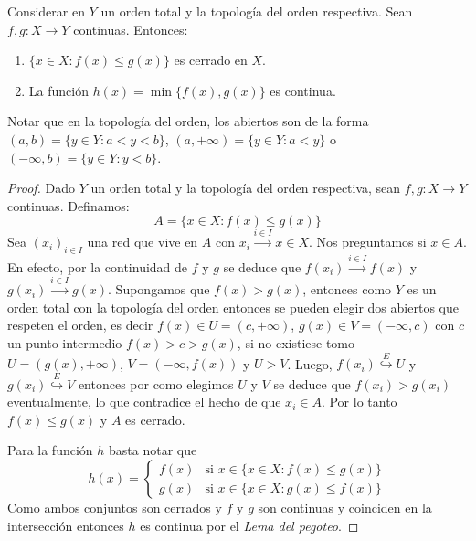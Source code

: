 \documentclass{article}
\theoremstyle{plain}
\theoremstyle{definition}
\newcommand{\evto}[1]{\stackrel{E}{\hookrightarrow} #1}   %
\newenvironment{ejercicio}[1]{\begin{trivlist}
\item[\hskip \labelsep {\bfseries Ejercicio}\hskip \labelsep {\bfseries #1.}]}{\end{trivlist}}
\begin{document}
\begin{ejercicio}{3}
    Considerar en \( Y \) un orden total y la topología del orden respectiva. Sean \( f, g : X \to Y \) continuas. Entonces:
    \begin{enumerate}
        \item \( \{ x \in X : f(x) \leq g(x) \} \) es cerrado en \( X \).
        \item La función \( h(x) = \min \{ f(x), g(x) \} \) es continua.
    \end{enumerate}
    Notar que en la topología del orden, los abiertos son de la forma \( (a, b) = \{ y \in Y : a < y < b \} \), \( (a, +\infty) = \{ y \in Y : a < y \} \) o \( (-\infty, b) = \{ y \in Y : y < b \} \).
\end{ejercicio}
\begin{proof}
    Dado \( Y \) un orden total y la topología del orden respectiva, sean \( f,g : X \to Y \) continuas. Definamos: \[
        A = \{ x \in X : f(x) \leq g(x) \}
    \]
    Sea \( {(x_i)}_{i \in I} \) una red que vive en \( A \) con \( x_i \xrightarrow{i \in I} x \in X \). Nos preguntamos si \( x \in A \). En efecto,
    por la continuidad de \( f \) y \( g \) se deduce que \( f(x_i) \xrightarrow{i \in I} f(x) \) y \( g(x_i) \xrightarrow{i \in I} g(x) \).
    Supongamos que \( f(x) > g(x) \), entonces como \( Y \) es un orden total con la topología del orden entonces se pueden elegir dos abiertos que respeten el orden, es decir \( f(x) \in U = (c, +\infty) \), \( g(x) \in V = (-\infty, c) \) con \( c \) un punto intermedio \( f(x) > c > g(x) \), si no existiese tomo \( U = (g(x), +\infty) \), \( V = (-\infty, f(x)) \) y \( U > V \).
    Luego, \( f(x_i) \evto{U} \) y \( g(x_i) \evto{V} \) entonces por como elegimos \( U \) y \( V \) se deduce que \( f(x_i) > g(x_i) \) eventualmente, lo que contradice el hecho de que \( x_i \in A \). Por lo tanto \( f(x) \leq g(x) \) y \( A \) es cerrado.

    Para la función \( h \) basta notar que \[
        h(x) = \begin{cases}
            f(x) & \text{si } x \in \{ x \in X : f(x) \leq g(x) \} \\
            g(x) & \text{si } x \in \{ x \in X : g(x) \leq f(x) \}
        \end{cases} \]
    Como ambos conjuntos son cerrados y \( f \) y \( g \) son continuas y coinciden en la intersección entonces \( h \) es continua por el \emph{Lema del pegoteo}.
\end{proof}
\end{document}
